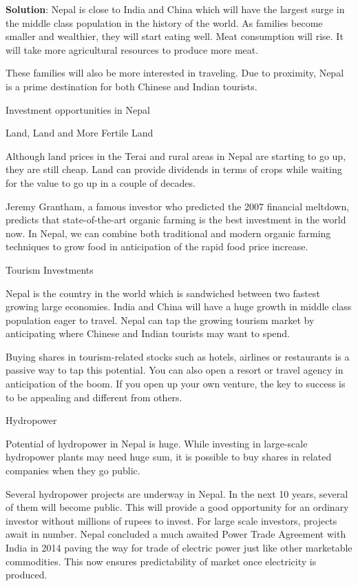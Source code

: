 \documentclass[
  openany]{book}
\newenvironment{solution}{ {\bfseries Solution}:}{}
\begin{document}
\begin{questions}
\begin{solution}
Nepal is close to India and China which will have the largest surge in the middle class population in the history of the world. As families become smaller and wealthier, they will start eating well. Meat consumption will rise. It will take more agricultural resources to produce more meat.

These families will also be more interested in traveling. Due to proximity, Nepal is a prime destination for both Chinese and Indian tourists.

Investment opportunities in Nepal

Land, Land and More Fertile Land

Although land prices in the Terai and rural areas in Nepal are starting to go up, they are still cheap. Land can provide dividends in terms of crops while waiting for the value to go up in a couple of decades.

Jeremy Grantham, a famous investor who predicted the 2007 financial meltdown, predicts that state-of-the-art organic farming is the best investment in the world now. In Nepal, we can combine both traditional and modern organic farming techniques to grow food in anticipation of the rapid food price increase.

Tourism Investments

Nepal is the country in the world which is sandwiched between two fastest growing large economies. India and China will have a huge growth in middle class population eager to travel. Nepal can tap the growing tourism market by anticipating where Chinese and Indian tourists may want to spend.

Buying shares in tourism-related stocks such as hotels, airlines or restaurants is a passive way to tap this potential. You can also open a resort or travel agency in anticipation of the boom. If you open up your own venture, the key to success is to be appealing and different from others.

Hydropower

Potential of hydropower in Nepal is huge. While investing in large-scale hydropower plants may need huge sum, it is possible to buy shares in related companies when they go public.

Several hydropower projects are underway in Nepal. In the next 10 years, several of them will become public. This will provide a good opportunity for an ordinary investor without millions of rupees to invest. For large scale investors, projects await in number. Nepal concluded a much awaited Power Trade Agreement with India in 2014 paving the way for trade of electric power just like other marketable commodities. This now ensures predictability of market once electricity is produced.


\end{solution}
\end{questions}
\end{document}
